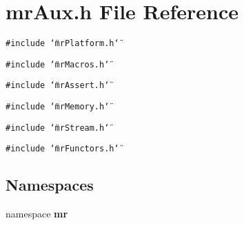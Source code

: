 \section{mr\-Aux.h File Reference}
\label{mrAux_8h}
{\tt \#include \char`\"{}mr\-Platform.h\char`\"{}}\par
{\tt \#include \char`\"{}mr\-Macros.h\char`\"{}}\par
{\tt \#include \char`\"{}mr\-Assert.h\char`\"{}}\par
{\tt \#include \char`\"{}mr\-Memory.h\char`\"{}}\par
{\tt \#include \char`\"{}mr\-Stream.h\char`\"{}}\par
{\tt \#include \char`\"{}mr\-Functors.h\char`\"{}}\par
\subsection*{Namespaces}
\begin{CompactItemize}
\item 
namespace {\bf mr}
\end{CompactItemize}
